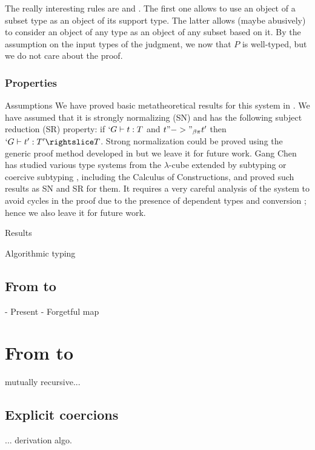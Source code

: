\documentclass[twocolumn]{article}
\begin{document}
The really interesting rules are  and
. The first one allows to use an object of a subset type
as an object of its support type. The latter allows (maybe abusively) to
consider an object of any type as an object of any subset based on
it. By the assumption on the input types of the judgment, we now that $P$
is well-typed, but we do not care about the proof.

\subsubsection{Properties}
\begin{paragraph}{Assumptions}
  We have proved basic metatheoretical results for this system in \Coq{}
  \cite{CCP}. We have assumed that it is strongly normalizing (SN) and has the
  following subject reduction (SR) property: if $`G \vdash t : T$ and $t
  "->"_{\beta\pi} t'$ then $`G \typed t' : T' \subd T$. Strong normalization
  could be proved using the generic proof method developed in
  \cite{Geuvers} but we leave it for future work. Gang Chen
  \cite{GangChen} has studied various type systems from the
  $\lambda$-cube extended by subtyping or coercive subtyping \cite{Luo},
  including the Calculus of Constructions, and proved such results as
  SN and SR for them. It requires a very careful analysis of the system 
  to avoid cycles in the proof due to the presence of dependent types and
  conversion ; hence we also leave it for future work.
\end{paragraph}

\begin{paragraph}{Results}
  

\end{paragraph}

\begin{paragraph}{Algorithmic typing}
\end{paragraph}

\subsection{From \CCq to \lng{}}
- Present \CCq
- Forgetful map

\section{From \lng{} to \CCq{}}
mutually recursive...

\subsection{Explicit coercions}
... derivation algo.
\end{document}
